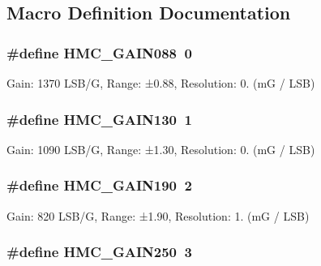 \subsection{Macro Definition Documentation}
\hypertarget{group___gain_settings_gaf207890e6273b1f15a84e8b142157da7}{
\subsubsection[{H\+M\+C\+\_\+\+G\+A\+I\+N088}]{\setlength{\rightskip}{0pt plus 5cm}\#define H\+M\+C\+\_\+\+G\+A\+I\+N088~0}}\label{group___gain_settings_gaf207890e6273b1f15a84e8b142157da7}
Gain\+: 1370 L\+S\+B/\+G, Range\+: ±0.88, Resolution\+: 0. (m\+G / L\+S\+B) \hypertarget{group___gain_settings_gadc095c910afd29670ed94d45589a4e94}{
\subsubsection[{H\+M\+C\+\_\+\+G\+A\+I\+N130}]{\setlength{\rightskip}{0pt plus 5cm}\#define H\+M\+C\+\_\+\+G\+A\+I\+N130~1}}\label{group___gain_settings_gadc095c910afd29670ed94d45589a4e94}
Gain\+: 1090 L\+S\+B/\+G, Range\+: ±1.30, Resolution\+: 0. (m\+G / L\+S\+B) \hypertarget{group___gain_settings_ga35560492e25e3bc4a7d1994afc20bf8d}{
\subsubsection[{H\+M\+C\+\_\+\+G\+A\+I\+N190}]{\setlength{\rightskip}{0pt plus 5cm}\#define H\+M\+C\+\_\+\+G\+A\+I\+N190~2}}\label{group___gain_settings_ga35560492e25e3bc4a7d1994afc20bf8d}
Gain\+: 820 L\+S\+B/\+G, Range\+: ±1.90, Resolution\+: 1. (m\+G / L\+S\+B) \hypertarget{group___gain_settings_ga1404e79685e5f7a10dea672d388f5efb}{
\subsubsection[{H\+M\+C\+\_\+\+G\+A\+I\+N250}]{\setlength{\rightskip}{0pt plus 5cm}\#define H\+M\+C\+\_\+\+G\+A\+I\+N250~3}}\label{group___gain_settings_ga1404e79685e5f7a10dea672d388f5efb}
